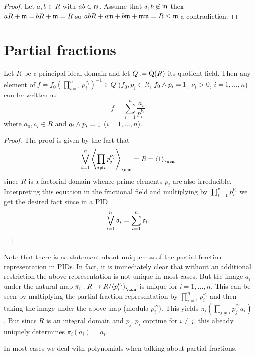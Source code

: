 \documentclass[8pt,a4paper]{article}
\begin{document}
\begin{proof}
    Let $a,b\in R$ with $ab\in \mathfrak{m}$. Assume that $a,b\not\in\mathfrak{m}$ then $aR+\mathfrak{m}=bR+\mathfrak{m}=R$ so $abR+a\mathfrak{m}+b\mathfrak{m}+\mathfrak{m}\mathfrak{m}=R\leq \mathfrak{m}$ a contradiction. 
\end{proof}

\section{Partial fractions}

\begin{lemma} Let $R$ be a principal ideal domain and let $Q:=\mathop{\mathrm{Q}}(R)$ its quotient field. Then any element of $f=f_0{(\prod_{i=1}^n{p_i^{\nu_i}})}^{-1}\in Q$ ($f_0,p_i\in R$, $f_0\wedge p_i=1$, $\nu_i>0$, $i=1,\ldots,n$) can be written as
    $$
    f = \sum_{i=1}^n{\frac{a_i}{p_i^{\nu_i}}}
    $$
    where $a_0,a_i\in R$ and $a_i\wedge p_i=1$ ($i=1,\ldots,n$).
\end{lemma}

\begin{proof}
    The proof is given by the fact that
    $$
    \Join_{i=1}^n{\gen[\con]{\prod_{j\neq i}{p_j^{\nu_j}}}}=R=\gen[\con]{1}
    $$
    since $R$ is a factorial domain whence prime elements $p_i$ are also irreducible.
    Interpreting this equation in the fractional field and multiplying by $\prod_{i=1}^n{p_i^{\nu_i}}$ we get the desired fact since in a PID
        $$
        \mathop\mathrm{\bigvee}_{i=1}^n{\mathfrak{a}_i}=\sum_{i=1}^n{\mathfrak{a}_i}.
        $$
\end{proof}

\begin{remark}[uniqueness]
    Note that there is no statement about uniqueness of the partial fraction representation in PIDs. In fact, it is immediately clear that without an additional restriction the above representation is not unique in most cases.
    But the image $\bar{a_i}$ under the natural map $\pi_i:R\to R/\gen[\con]{p_i^{\nu_i}}$ is unique for $i=1,\ldots,n$.
This can be seen by multiplying the partial fraction representation by $\prod_{i=1}^n{p_i^{\nu_i}}$ and then taking the image under the above map (modulo $p_i^{\nu_i}$). This yields $\pi_i(\prod_{j\neq i}{p_j^{\nu_j}}a_i)$. But since $R$ is an integral domain and $p_j, p_i$ coprime for $i\neq j$, this already uniquely determines $\pi_i(a_i)=\bar{a_i}$.
\end{remark}


In most cases we deal with polynomials when talking about partial fractions.
\end{document}
